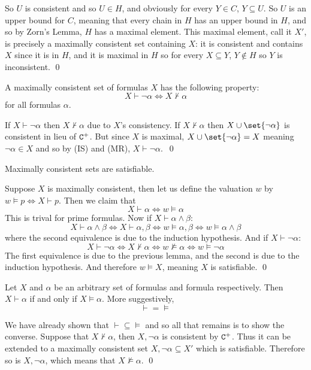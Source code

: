So $U$ is consistent and so $U\in H$, and obviously for every $Y\in C$, $Y\subseteq U$.
So $U$ is an upper bound for $C$, meaning that every chain in $H$ has an upper bound in $H$, and so by Zorn's Lemma, $H$ has a maximal element.
This maximal element, call it $X'$, is precisely a maximally consistent set containing $X$: it is consistent and contains $X$ since it is in $H$, and it is maximal in $H$ so for every $X\subseteq Y$,
$Y\notin H$ so $Y$ is inconsistent.
\qed

\blemm

    A maximally consistent set of formulas $X$ has the following property:
    $$ X\vdash\neg\alpha \iff X\nvdash\alpha $$
    for all formulas $\alpha$.

\elemm

If $X\vdash\neg\alpha$ then $X\nvdash\alpha$ due to $X$'s consistency.
If $X\nvdash\alpha$ then $X\cup\set{\neg\alpha}$ is consistent in lieu of ${\tt C}^+$.
But since $X$ is maximal, $X\cup\set{\neg\alpha}=X$ meaning $\neg\alpha\in X$ and so by (IS) and (MR), $X\vdash\neg\alpha$.\
\qed

\blemm

    Maximally consistent sets are satisfiable.

\elemm

Suppose $X$ is maximally consistent, then let us define the valuation $w$ by $w\vDash p \iff X\vdash p$.
Then we claim that
$$ X\vdash\alpha \iff w\vDash\alpha $$
This is trival for prime formulas.
Now if $X\vdash\alpha\land\beta$:
$$ X\vdash\alpha\land\beta \iff X\vdash\alpha,\beta \iff w\vDash\alpha,\beta \iff w\vDash\alpha\land\beta $$
where the second equivalence is due to the induction hypothesis.
And if $X\vdash\neg\alpha$:
$$ X\vdash\neg\alpha \iff X\nvdash\alpha \iff w\nvDash\alpha \iff w\vDash\neg\alpha $$
The first equivalence is due to the previous lemma, and the second is due to the induction hypothesis.
And therefore $w\vDash X$, meaning $X$ is satisfiable.
\qed

\bthrm[title=The Completeness Theorem, name=propcompletethrm]

    Let $X$ and $\alpha$ be an arbitrary set of formulas and formula respectively.
    Then $X\vdash\alpha$ if and only if $X\vDash\alpha$.
    More suggestively,
    $$ {\vdash}={\vDash} $$

\ethrm

We have already shown that ${\vdash}\subseteq{\vDash}$ and so all that remains is to show the converse.
Suppose that $X\nvdash\alpha$, then $X,\neg\alpha$ is consistent by ${\tt C}^+$.
Thus it can be extended to a maximally consistent set $X,\neg\alpha\subseteq X'$ which is satisfiable.
Therefore so is $X,\neg\alpha$, which means that $X\nvDash\alpha$.
\qed

